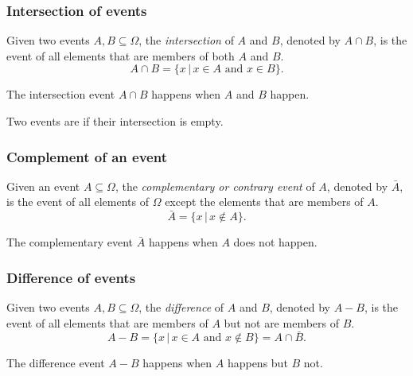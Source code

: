 \begin{frame}
\frametitle{Intersection of events}
\begin{definition}
Given two events $A,B\subseteq \Omega$, the \emph{intersection} of $A$ and $B$, denoted by $A\cap B$, is the
event of all elements that are members of both $A$ and $B$.
\[
A\cap B = \{x\,|\, x\in A\textrm{ and }x\in B\}.
\]
\end{definition}

\begin{center}

\end{center}
The intersection event $A\cap B$ happens when $A$ \alert{and} $B$ happen.


Two events are  if their intersection is empty.
\end{frame}


\begin{frame}
\frametitle{Complement of an event}
\begin{definition}
Given an event $A\subseteq \Omega$, the \emph{complementary or contrary event} of $A$, denoted by $\bar A$, is
the event of all elements of $\Omega$ except the elements that are members of $A$.
\[
\bar A = \{x\,|\, x\not\in A\}.
\]
\end{definition}

\begin{center}

\end{center}

The complementary event $\bar A$ happens when $A$ does \alert{not} happen.
\end{frame}


\begin{frame}
\frametitle{Difference of events}
\begin{definition}
Given two events $A,B\subseteq \Omega$, the \emph{difference} of $A$ and $B$, denoted by $A-B$, is the
event of all elements that are members of $A$ but not are members of $B$.
\[
A-B = \{x\,|\, x\in A\textrm{ and }x\not\in B\} = A \cap \bar B.
\]
\end{definition}

\begin{center}

\end{center}

The difference event $A-B$ happens when $A$ happens but $B$ not.
\end{frame}



